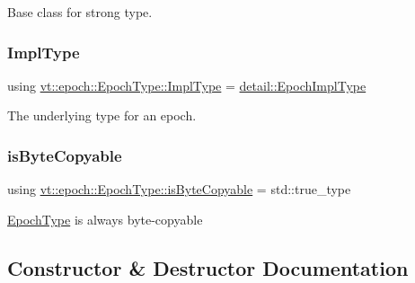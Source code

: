 Base class for strong type. 

\mbox{\label{structvt_1_1epoch_1_1_epoch_type_aef70d29ac80a421e67bc15ffbe9b9e70}} 
\subsubsection{\texorpdfstring{Impl\+Type}{ImplType}}
{\footnotesize\ttfamily using \hyperlink{structvt_1_1epoch_1_1_epoch_type_aef70d29ac80a421e67bc15ffbe9b9e70}{vt\+::epoch\+::\+Epoch\+Type\+::\+Impl\+Type} =  \hyperlink{namespacevt_1_1epoch_1_1detail_a9adc5df96a521e516dc20511eb553075}{detail\+::\+Epoch\+Impl\+Type}}



The underlying type for an epoch. 

\mbox{\label{structvt_1_1epoch_1_1_epoch_type_a6cf10baa6f0c733aded770d31d0c09a0}} 
\subsubsection{\texorpdfstring{is\+Byte\+Copyable}{isByteCopyable}}
{\footnotesize\ttfamily using \hyperlink{structvt_1_1epoch_1_1_epoch_type_a6cf10baa6f0c733aded770d31d0c09a0}{vt\+::epoch\+::\+Epoch\+Type\+::is\+Byte\+Copyable} =  std\+::true\+\_\+type}



{\ttfamily \hyperlink{structvt_1_1epoch_1_1_epoch_type}{Epoch\+Type}} is always byte-\/copyable 



\subsection{Constructor \& Destructor Documentation}
\mbox{\label{structvt_1_1epoch_1_1_epoch_type_af81c3687330f393102a6a19d6e2e9068}} 
